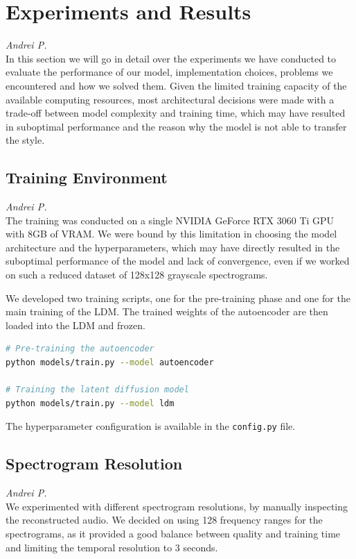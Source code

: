 \section{Experiments and Results}
\textit{Andrei P.}\\
In this section we will go in detail over the experiments we have conducted to evaluate the performance of our model, implementation choices, problems we encountered and how we solved them. Given the limited training capacity of the available computing resources, most architectural decisions were made with a trade-off between model complexity and training time, which may have resulted in suboptimal performance and the reason why the model is not able to transfer the style.

\subsection{Training Environment}
\textit{Andrei P.}\\
The training was conducted on a single NVIDIA GeForce RTX 3060 Ti GPU with 8GB of VRAM. We were bound by this limitation in choosing the model architecture and the hyperparameters, which may have directly resulted in the suboptimal performance of the model and lack of convergence, even if we worked on such a reduced dataset of 128x128 grayscale spectrograms.

\vspace{1em}

\noindent We developed two training scripts, one for the pre-training phase and one for the main training of the LDM. The trained weights of the autoencoder are then loaded into the LDM and frozen.

\begin{lstlisting}[language=bash, basicstyle=\tiny]
# Pre-training the autoencoder
python models/train.py --model autoencoder

# Training the latent diffusion model
python models/train.py --model ldm
\end{lstlisting}

\noindent The hyperparameter configuration is available in the \texttt{config.py} file.


\subsection{Spectrogram Resolution}
\textit{Andrei P.}\\
We experimented with different spectrogram resolutions, by manually inspecting the reconstructed audio. We decided on using 128 frequency ranges for the spectrograms, as it provided a good balance between quality and training time and limiting the temporal resolution to 3 seconds.

